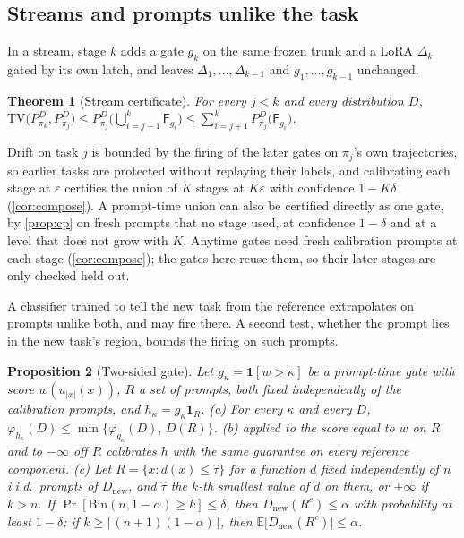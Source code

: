 \documentclass{article}
\theoremstyle{plain}
\newtheorem{theorem}{Theorem}[section]
\newtheorem{proposition}[theorem]{Proposition}
\theoremstyle{definition}
\theoremstyle{remark}
\newcommand{\E}{\mathbb{E}}
\newcommand{\TV}{\mathrm{TV}}
\newcommand{\Dnew}{D_{\mathrm{new}}}
\newcommand{\Fire}{\mathsf{F}}
\newcommand{\ind}{\mathbf{1}}
\begin{document}
\subsection{Streams and prompts unlike the task}

In a stream, stage $k$ adds a gate $g_k$ on the same frozen trunk and a LoRA $\Delta_k$ gated by its own
latch, and leaves $\Delta_1,\dots,\Delta_{k-1}$ and $g_1,\dots,g_{k-1}$ unchanged.

\begin{theorem}[Stream certificate]
\label{thm:stream}
For every $j<k$ and every distribution $D$,
$\TV\big(P^D_{\pi_k},P^D_{\pi_j}\big)\le P^D_{\pi_j}\big(\bigcup_{i=j+1}^{k}\Fire_{g_i}\big)
\le\sum_{i=j+1}^{k}P^D_{\pi_j}\big(\Fire_{g_i}\big)$.
\end{theorem}

Drift on task $j$ is bounded by the firing of the later gates on $\pi_j$'s own trajectories, so earlier tasks
are protected without replaying their labels, and calibrating each stage at $\varepsilon$ certifies the union of $K$
stages at $K\varepsilon$ with confidence $1-K\delta$ (\cref{cor:compose}). A prompt-time union can also be certified directly
as one gate, by \cref{prop:cp} on fresh prompts that no stage used, at confidence $1-\delta$ and at a level that does
not grow with $K$. Anytime gates need fresh calibration
prompts at each stage (\cref{cor:compose}); the gates here reuse them, so their later stages are only checked held out.

A classifier trained to tell the new task from the reference extrapolates on prompts unlike both, and may fire there. A
second test, whether the prompt lies in the new task's region, bounds the firing on such prompts.

\begin{proposition}[Two-sided gate]
\label{prop:twosided}
Let $g_\kappa=\ind[w>\kappa]$ be a prompt-time gate with score $w(u_{|x|}(x))$, $R$ a set of prompts, both fixed
independently of the calibration prompts, and $h_\kappa=g_\kappa\ind_R$. (a) For every $\kappa$ and every $D$,
$\varphi_{h_\kappa}(D)\le\min\{\varphi_{g_\kappa}(D),\,D(R)\}$. (b)  applied to the score equal
to $w$ on $R$ and to $-\infty$ off $R$ calibrates $h$ with the same guarantee on every reference component. (c) Let
$R=\{x:d(x)\le\hat\tau\}$ for a function $d$ fixed independently of $n$ i.i.d.\ prompts of $\Dnew$, and $\hat\tau$ the
$k$-th smallest value of $d$ on them, or $+\infty$ if $k>n$. If $\Pr[\mathrm{Bin}(n,1-\alpha)\ge k]\le\delta$,
then $\Dnew(R^c)\le\alpha$ with probability at least $1-\delta$; if $k\ge\lceil(n+1)(1-\alpha)\rceil$, then
$\E\big[\Dnew(R^c)\big]\le\alpha$.
\end{proposition}
\end{document}
